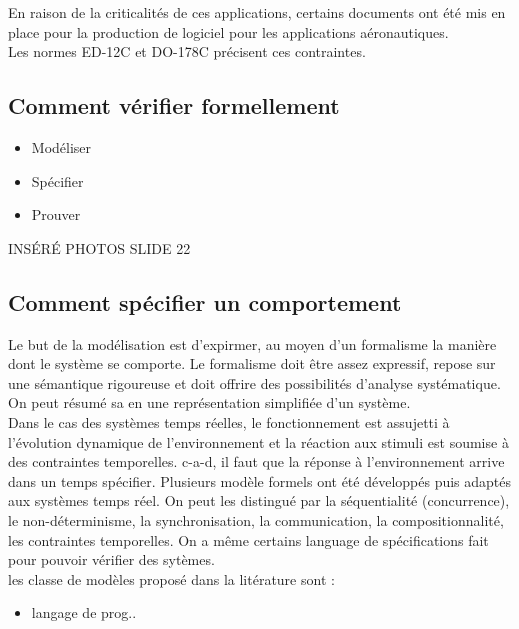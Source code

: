 \documentclass[oneside]{book}
\begin{document}
    En raison de la criticalités de ces applications, certains documents ont été mis en place pour la production de logiciel pour les applications aéronautiques.\\
    
    Les normes ED-12C et DO-178C précisent ces contraintes.\\
    
    \subsection{Comment vérifier formellement}
    \begin{itemize}
        \item Modéliser
        \item Spécifier
        \item Prouver
    \end{itemize}

    INSÉRÉ PHOTOS SLIDE 22\\
    
    \subsection{Comment spécifier un comportement}
    Le but de la modélisation est d'expirmer, au moyen d'un formalisme la manière dont le système se comporte. Le formalisme doit être assez expressif, repose sur une sémantique rigoureuse et doit offrire des possibilités d'analyse systématique. On peut résumé sa en une représentation simplifiée d'un système.\\
    
    Dans le cas des systèmes temps réelles, le fonctionnement est assujetti à l'évolution dynamique de l'environnement et la réaction aux stimuli est soumise à des contraintes temporelles. c-a-d, il faut que la réponse à l'environnement arrive dans un temps spécifier. Plusieurs modèle formels ont été développés puis adaptés aux systèmes temps réel. On peut les distingué par la séquentialité (concurrence), le non-déterminisme, la synchronisation, la communication, la compositionnalité, les contraintes temporelles. On a même certains language de spécifications fait pour pouvoir vérifier des sytèmes.\\
    
    les classe de modèles proposé dans la litérature sont :
    \begin{itemize}
        \item langage de prog..
    \end{itemize}
    
\end{document}
